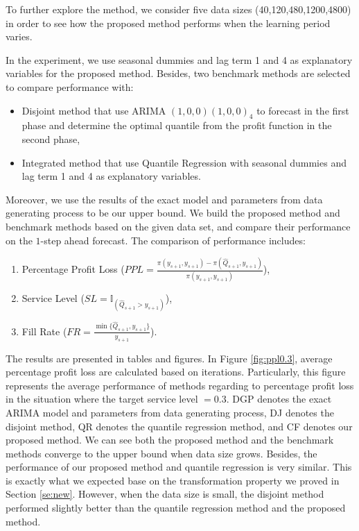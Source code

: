 \documentclass{article}
\begin{document}
To further explore the method, we consider five data sizes (40,120,480,1200,4800) in order to see how the proposed method performs when the learning period varies.

In the experiment, we use seasonal dummies and lag term 1 and 4 as explanatory variables for the proposed method. Besides, two benchmark methods are selected to compare performance with:
\begin{itemize}
    \item Disjoint method that use ARIMA $(1,0,0)(1,0,0)_4$ to forecast in the first phase and determine the optimal quantile from the profit function in the second phase,
    \item Integrated method that use Quantile Regression with seasonal dummies and lag term 1 and 4 as explanatory variables.
\end{itemize}
Moreover, we use the results of the exact model and parameters from data generating process to be our upper bound. We build the proposed method and benchmark methods based on the given data set, and compare their performance on the $1$-step ahead forecast. The comparison of performance includes:
\begin{enumerate}
    \item Percentage Profit Loss ($PPL=\frac{\pi(y_{s+1},y_{s+1})-\pi(\hat{Q}_{s+1},y_{s+1})}{\pi(y_{s+1},y_{s+1})}$),
    \item Service Level ($SL=\mathbb {I}_{(\hat{Q}_{s+1}>y_{s+1})}$),
    \item Fill Rate ($FR=\frac{\min\{\hat{Q}_{s+1},y_{s+1}\}}{y_{s+1}}$).
\end{enumerate}

The results are presented in tables and figures. In Figure \ref{fig:ppl0.3}, average percentage profit loss are calculated based on iterations. Particularly, this figure represents the average performance of methods regarding to percentage profit loss in the situation where the target service level $=0.3$. DGP denotes the exact ARIMA model and parameters from data generating process, DJ denotes the disjoint method, QR denotes the quantile regression method, and CF denotes our proposed method. We can see both the proposed method and the benchmark methods converge to the upper bound when data size grows. Besides, the performance of our proposed method and quantile regression is very similar. This is exactly what we expected base on the transformation property we proved in Section \ref{se:new}. However, when the data size is small, the disjoint method performed slightly better than the quantile regression method and the proposed method. 
\end{document}
